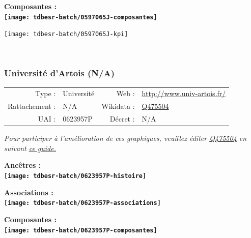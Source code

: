 \documentclass[12pt,french,]{article}
\begin{document}
\hrulefill

\begin{center} \bf Composantes : \\  
\texttt{[image: tdbesr-batch/0597065J-composantes]} \end{center}

\begin{center}\texttt{[image: tdbesr-batch/0597065J-kpi]} \end{center}\checkoddpage

\ifoddpage \fi ~\newpage  

\hypertarget{universituxe9-dartois-na}{%
\subsubsection{Université d'Artois
(N/A)}\label{universituxe9-dartois-na}}

\begin{tabular*}{\textwidth}{rp{5cm}rl}  
\hline  
Type : & Université & Web : &\href{http://www.univ-artois.fr/}{http://www.univ-artois.fr/} \\  
Rattachement : & N/A & Wikidata : & \href{https://www.wikidata.org/entity/Q475504}{Q475504} \\  
UAI : & 0623957P & Décret : & N/A \\  
\hline  
\end{tabular*}

\textit{\scriptsize Pour participer à l'amélioration de ces graphiques, veuillez éditer  \href{https://www.wikidata.org/entity/Q475504}{Q475504}  en suivant \href{https://github.com/cpesr/wikidataESR/blob/master/Rmd/wikidataESR.md}{ce guide.}}

\vspace{1cm}  
\begin{minipage}[b]{0.50\textwidth}\begin{center} \bf Ancêtres : \\  
\texttt{[image: tdbesr-batch/0623957P-histoire]} \end{center}\end{minipage}\begin{minipage}[b]{0.50\textwidth}\begin{center} \bf Associations : \\  
\texttt{[image: tdbesr-batch/0623957P-associations]} \end{center}\end{minipage}

\hrulefill

\begin{center} \bf Composantes : \\  
\texttt{[image: tdbesr-batch/0623957P-composantes]} \end{center}
\end{document}
